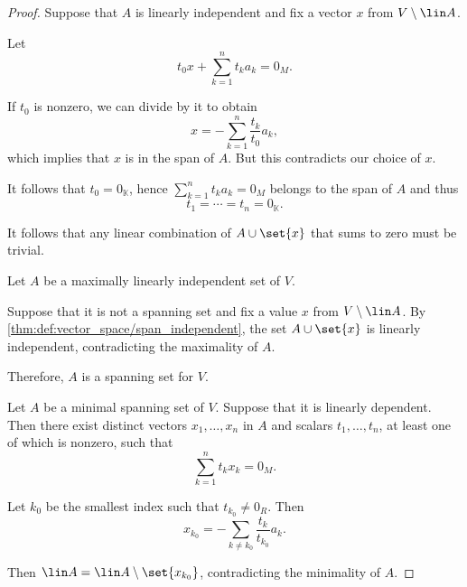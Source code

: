 \begin{proof}
   Suppose that \( A \) is linearly independent and fix a vector \( x \) from \( V \setminus \lin A \).

  Let
  \begin{equation*}
    t_0 x + \sum_{k=1}^n t_k a_k = 0_M.
  \end{equation*}

  If \( t_0 \) is nonzero, we can divide by it to obtain
  \begin{equation*}
    x = -\sum_{k=1}^n \frac {t_k} {t_0} a_k,
  \end{equation*}
  which implies that \( x \) is in the span of \( A \). But this contradicts our choice of \( x \).

  It follows that \( t_0 = 0_\BbbK \), hence \( \sum_{k=1}^n t_k a_k = 0_M \) belongs to the span of \( A \) and thus
  \begin{equation*}
    t_1 = \cdots = t_n = 0_\BbbK.
  \end{equation*}

  It follows that any linear combination of \( A \cup \set{ x } \) that sums to zero must be trivial.

   Let \( A \) be a maximally linearly independent set of \( V \).

  Suppose that it is not a spanning set and fix a value \( x \) from \( V \setminus \lin A \). By \cref{thm:def:vector_space/span_independent}, the set \( A \cup \set{ x } \) is linearly independent, contradicting the maximality of \( A \).

  Therefore, \( A \) is a spanning set for \( V \).

   Let \( A \) be a minimal spanning set of \( V \). Suppose that it is linearly dependent. Then there exist distinct vectors \( x_1, \ldots, x_n \) in \( A \) and scalars \( t_1, \ldots, t_n \), at least one of which is nonzero, such that
  \begin{equation*}
    \sum_{k=1}^n t_k x_k = 0_M.
  \end{equation*}

  Let \( k_0 \) be the smallest index such that \( t_{k_0} \neq 0_R \). Then
  \begin{equation*}
    x_{k_0} = -\sum_{k \neq k_0} \frac {t_k} {t_{k_0}} a_k.
  \end{equation*}

  Then \( \lin A = \lin A \setminus \set{ x_{k_0} } \), contradicting the minimality of \( A \).


\end{proof}
